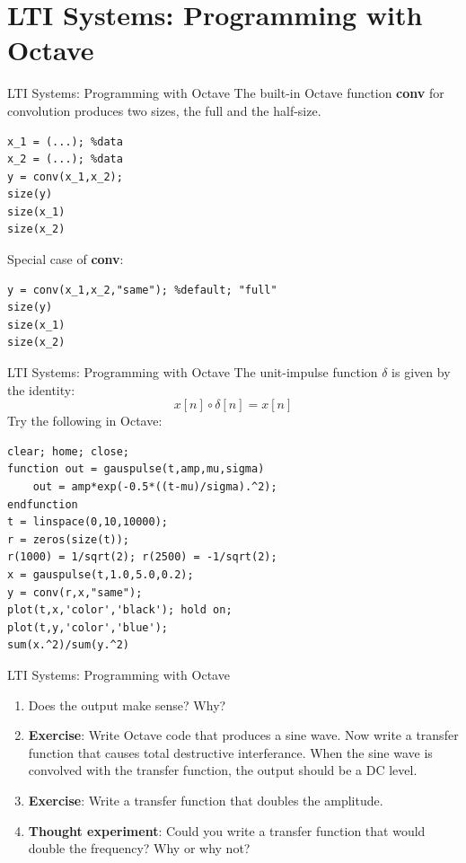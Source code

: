 \documentclass{beamer}
\begin{document}
\section{LTI Systems: Programming with Octave}

\begin{frame}[fragile]{LTI Systems: Programming with Octave}
\small
The built-in Octave function \textbf{conv} for convolution produces two sizes, the full and the half-size.
\begin{verbatim}
x_1 = (...); %data
x_2 = (...); %data
y = conv(x_1,x_2);
size(y)
size(x_1)
size(x_2)
\end{verbatim}
Special case of \textbf{conv}:
\begin{verbatim}
y = conv(x_1,x_2,"same"); %default; "full"
size(y)
size(x_1)
size(x_2)
\end{verbatim}
\end{frame}

\begin{frame}[fragile]{LTI Systems: Programming with Octave}
\small
The \alert{unit-impulse} function $\delta$ is given by the identity:
\begin{equation}
x[n] \circ \delta[n] = x[n] \label{eq:impulse}
\end{equation}
Try the following in Octave:
\begin{verbatim}
clear; home; close;
function out = gauspulse(t,amp,mu,sigma)
    out = amp*exp(-0.5*((t-mu)/sigma).^2);
endfunction
t = linspace(0,10,10000);
r = zeros(size(t));
r(1000) = 1/sqrt(2); r(2500) = -1/sqrt(2);
x = gauspulse(t,1.0,5.0,0.2);
y = conv(r,x,"same");
plot(t,x,'color','black'); hold on;
plot(t,y,'color','blue');
sum(x.^2)/sum(y.^2)
\end{verbatim}
\end{frame}

\begin{frame}[fragile]{LTI Systems: Programming with Octave}	
\small
\begin{enumerate}
\item Does the output make sense? Why?
\item \textbf{Exercise}: Write Octave code that produces a sine wave.  Now write a transfer function that causes total destructive interferance.  When the sine wave is convolved with the transfer function, the output should be a DC level.
\item \textbf{Exercise}: Write a transfer function that doubles the amplitude.
\item \textbf{Thought experiment}: Could you write a transfer function that would double the frequency?  Why or why not?
\end{enumerate}
\end{frame}
\end{document}
